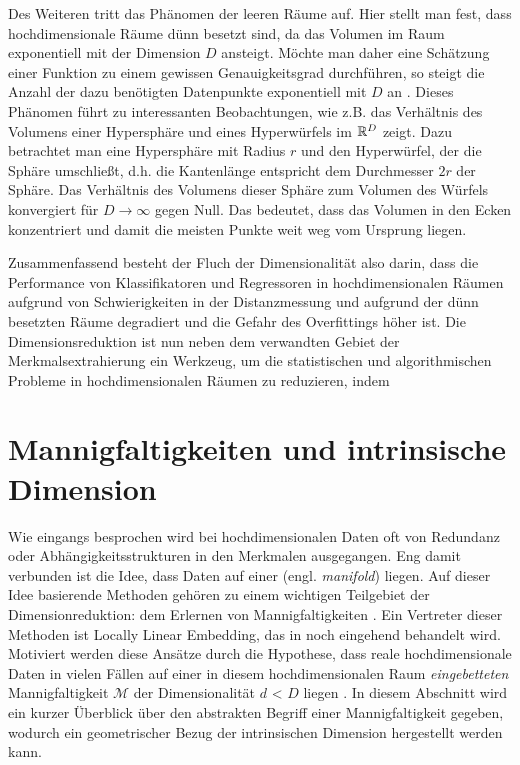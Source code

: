 Des Weiteren tritt das Phänomen der leeren Räume auf. Hier stellt man fest, dass hochdimensionale
Räume dünn besetzt sind, da das Volumen im Raum exponentiell mit der Dimension $D$ ansteigt. Möchte
man daher eine Schätzung einer Funktion zu einem gewissen Genauigkeitsgrad durchführen, so steigt
die Anzahl der dazu benötigten Datenpunkte exponentiell mit $D$ an \parencite[6]{Lee.2007}. Dieses Phänomen führt zu interessanten Beobachtungen, wie z.B. das Verhältnis
des Volumens einer Hypersphäre und eines Hyperwürfels im $\mathbb{R}^D$ zeigt. Dazu betrachtet man eine
Hypersphäre mit Radius $r$ und den Hyperwürfel, der die Sphäre umschließt, d.h. die Kantenlänge
entspricht dem Durchmesser $2r$ der Sphäre. Das Verhältnis des Volumens dieser Sphäre zum Volumen
des Würfels konvergiert für $D \rightarrow \infty$ gegen Null. Das bedeutet, dass das Volumen in
den Ecken konzentriert \parencite[6 -- 7]{Lee.2007} und damit die meisten Punkte weit weg vom Ursprung liegen.

Zusammenfassend besteht der Fluch der Dimensionalität also darin, dass die Performance von
Klassifikatoren und Regressoren in hochdimensionalen Räumen aufgrund von Schwierigkeiten in der
Distanzmessung und aufgrund der dünn besetzten Räume degradiert und die Gefahr des Overfittings
höher ist. Die Dimensionsreduktion ist nun neben dem verwandten Gebiet der Merkmalsextrahierung ein
Werkzeug, um die statistischen und algorithmischen Probleme in hochdimensionalen Räumen zu
reduzieren, indem

\section{Mannigfaltigkeiten und intrinsische Dimension}
\label{ch:Dimensionsreduktion:MannigfaltigkeitenIntrinsDim}

Wie eingangs besprochen wird bei hochdimensionalen Daten oft von Redundanz oder
Abhängigkeitsstrukturen in den Merkmalen ausgegangen. Eng damit verbunden ist die Idee, dass Daten
auf einer  (engl. \textit{manifold}) liegen. Auf dieser Idee basierende
Methoden gehören zu einem wichtigen Teilgebiet der Dimensionreduktion: dem Erlernen von
Mannigfaltigkeiten \parencite{Cayton.2005}. Ein Vertreter dieser Methoden ist Locally Linear Embedding, das in
 noch eingehend behandelt wird. Motiviert werden
diese Ansätze durch die Hypothese, dass reale hochdimensionale Daten in vielen Fällen auf einer in
diesem hochdimensionalen Raum \textit{eingebetteten} Mannigfaltigkeit $\mathcal{M}$ der
Dimensionalität $d$ < $D$ liegen \parencite[vgl.][1]{Cayton.2005}. In diesem Abschnitt wird ein kurzer Überblick über den abstrakten
Begriff einer Mannigfaltigkeit gegeben, wodurch ein geometrischer Bezug der intrinsischen Dimension
hergestellt werden kann.

